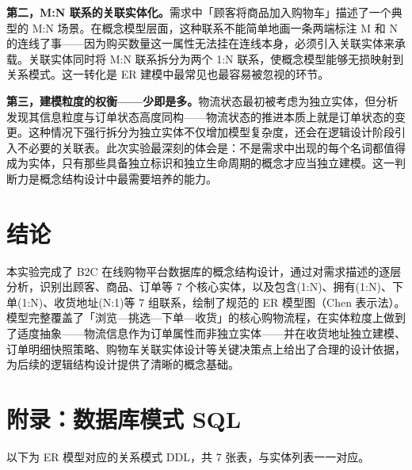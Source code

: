 \documentclass[12pt, a4paper]{academics}
\begin{document}
\textbf{第二，M:N 联系的关联实体化。}需求中「顾客将商品加入购物车」描述了一个典型的 M:N 场景。在概念模型层面，这种联系不能简单地画一条两端标注 M 和 N 的连线了事——因为购买数量这一属性无法挂在连线本身，必须引入关联实体来承载。关联实体同时将 M:N 联系拆分为两个 1:N 联系，使概念模型能够无损映射到关系模式。这一转化是 ER 建模中最常见也最容易被忽视的环节。

\textbf{第三，建模粒度的权衡——少即是多。}物流状态最初被考虑为独立实体，但分析发现其信息粒度与订单状态高度同构——物流状态的推进本质上就是订单状态的变更。这种情况下强行拆分为独立实体不仅增加模型复杂度，还会在逻辑设计阶段引入不必要的关联表。此次实验最深刻的体会是：不是需求中出现的每个名词都值得成为实体，只有那些具备独立标识和独立生命周期的概念才应当独立建模。这一判断力是概念结构设计中最需要培养的能力。

\section{结论}

本实验完成了 B2C 在线购物平台数据库的概念结构设计，通过对需求描述的逐层分析，识别出顾客、商品、订单等 7 个核心实体，以及包含(1:N)、拥有(1:N)、下单(1:N)、收货地址(N:1)等 7 组联系，绘制了规范的 ER 模型图（Chen 表示法）。模型完整覆盖了「浏览—挑选—下单—收货」的核心购物流程，在实体粒度上做到了适度抽象——物流信息作为订单属性而非独立实体——并在收货地址独立建模、订单明细快照策略、购物车关联实体设计等关键决策点上给出了合理的设计依据，为后续的逻辑结构设计提供了清晰的概念基础。

\appendix
\section{附录：数据库模式 SQL}

以下为 ER 模型对应的关系模式 DDL，共 7 张表，与实体列表一一对应。

\inputminted{text}{../res/schema.sql}
\end{document}
